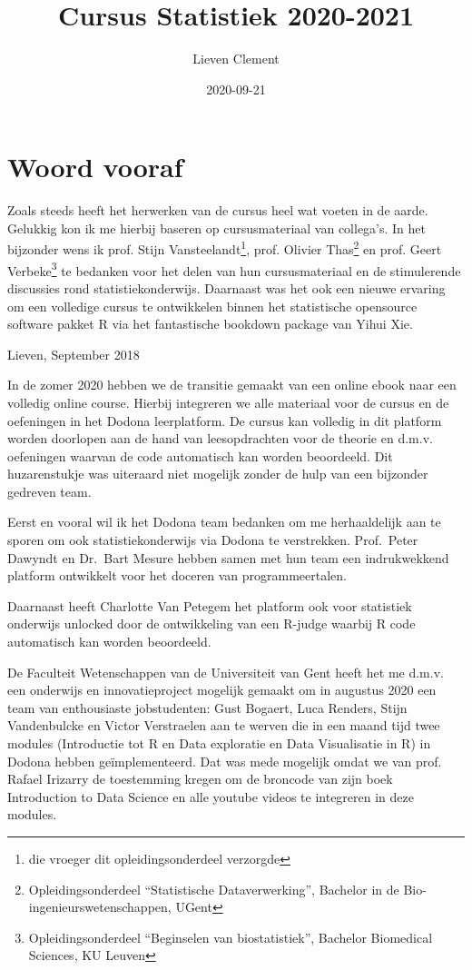 \documentclass[
  12pt,dutch,coursenotes]{book}
\title{Cursus Statistiek 2020-2021}
\author{Lieven Clement}
\date{2020-09-21}
\theoremstyle{definition}
\theoremstyle{definition}
\theoremstyle{definition}
\theoremstyle{remark}
\begin{document}
\maketitle

{
\setcounter{tocdepth}{1}
\tableofcontents
}
\hypertarget{woord-vooraf}{%
\chapter*{Woord vooraf}\label{woord-vooraf}}

Zoals steeds heeft het herwerken van de cursus heel wat voeten in de aarde. Gelukkig kon ik me hierbij baseren op cursusmateriaal van collega's. In het bijzonder wens ik prof. Stijn Vansteelandt\footnote{die vroeger dit opleidingsonderdeel verzorgde}, prof. Olivier Thas\footnote{Opleidingsonderdeel ``Statistische Dataverwerking'', Bachelor in de Bio-ingenieurswetenschappen, UGent} en prof. Geert Verbeke\footnote{Opleidingsonderdeel ``Beginselen van biostatistiek'', Bachelor Biomedical Sciences, KU Leuven} te bedanken voor het delen van hun cursusmateriaal en de stimulerende discussies rond statistiekonderwijs. Daarnaast was het ook een nieuwe ervaring om een volledige cursus te ontwikkelen binnen het statistische opensource software pakket R via het fantastische bookdown package van Yihui Xie.

Lieven, September 2018

In de zomer 2020 hebben we de transitie gemaakt van een online ebook naar een volledig online course.
Hierbij integreren we alle materiaal voor de cursus en de oefeningen in het Dodona leerplatform.
De cursus kan volledig in dit platform worden doorlopen aan de hand van leesopdrachten voor de theorie en d.m.v. oefeningen waarvan de code automatisch kan worden beoordeeld.
Dit huzarenstukje was uiteraard niet mogelijk zonder de hulp van een bijzonder gedreven team.

Eerst en vooral wil ik het Dodona team bedanken om me herhaaldelijk aan te sporen om ook statistiekonderwijs via Dodona te verstrekken. Prof.~Peter Dawyndt en Dr.~Bart Mesure hebben samen met hun team een indrukwekkend platform ontwikkelt voor het doceren van programmeertalen.

Daarnaast heeft Charlotte Van Petegem het platform ook voor statistiek onderwijs unlocked door de ontwikkeling van een R-judge waarbij R code automatisch kan worden beoordeeld.

De Faculteit Wetenschappen van de Universiteit van Gent heeft het me d.m.v. een onderwijs en innovatieproject mogelijk gemaakt om in augustus 2020 een team van enthousiaste jobstudenten: Gust Bogaert, Luca Renders, Stijn Vandenbulcke en Victor Verstraelen aan te werven die in een maand tijd twee modules (Introductie tot R en Data exploratie en Data Visualisatie in R) in Dodona hebben geïmplementeerd. Dat was mede mogelijk omdat we van prof. Rafael Irizarry de toestemming kregen om de broncode van zijn boek Introduction to Data Science en alle youtube videos te integreren in deze modules.
\end{document}
